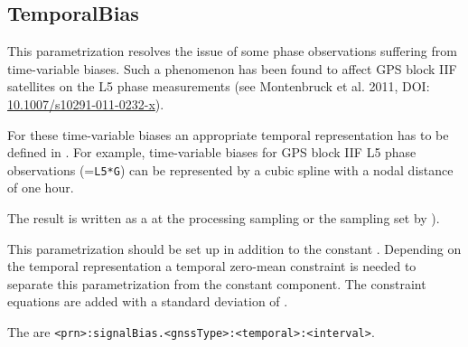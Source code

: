 \subsection{TemporalBias}\label{gnssParametrizationType:temporalBias}
This parametrization resolves the issue of some phase observations suffering from time-variable biases.
Such a phenomenon has been found to affect GPS block IIF satellites on the L5 phase measurements
(see Montenbruck et al. 2011, DOI: \href{https://doi.org/10.1007/s10291-011-0232-x}{10.1007/s10291-011-0232-x}).

For these time-variable biases an appropriate temporal representation has to be defined in
.
For example, time-variable biases for GPS block IIF L5 phase observations (=\verb|L5*G|)
can be represented by a cubic spline with a nodal distance of one hour.

The result is written as a  at the processing sampling
or the sampling set by ).

This parametrization should be set up in addition to the constant
.
Depending on the temporal representation a temporal zero-mean constraint is needed
to separate this parametrization from the constant component. The constraint equations are added with
a standard deviation of .

The  are
\verb|<prn>:signalBias.<gnssType>:<temporal>:<interval>|.


